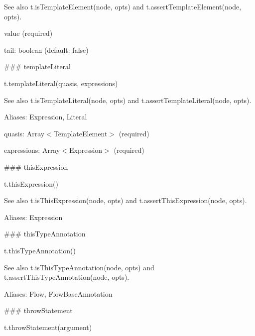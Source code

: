 See also {\ttfamily t.\+is\+Template\+Element(node, opts)} and {\ttfamily t.\+assert\+Template\+Element(node, opts)}.


\begin{DoxyItemize}
\item {\ttfamily value} (required)
\item {\ttfamily tail}\+: {\ttfamily boolean} (default\+: {\ttfamily false}) 


\end{DoxyItemize}

\#\#\# template\+Literal 
\begin{DoxyCode}
t.templateLiteral(quasis, expressions)
\end{DoxyCode}


See also {\ttfamily t.\+is\+Template\+Literal(node, opts)} and {\ttfamily t.\+assert\+Template\+Literal(node, opts)}.

Aliases\+: {\ttfamily Expression}, {\ttfamily Literal}


\begin{DoxyItemize}
\item {\ttfamily quasis}\+: {\ttfamily Array$<$Template\+Element$>$} (required)
\item {\ttfamily expressions}\+: {\ttfamily Array$<$Expression$>$} (required) 


\end{DoxyItemize}

\#\#\# this\+Expression 
\begin{DoxyCode}
t.thisExpression()
\end{DoxyCode}


See also {\ttfamily t.\+is\+This\+Expression(node, opts)} and {\ttfamily t.\+assert\+This\+Expression(node, opts)}.

Aliases\+: {\ttfamily Expression}





\#\#\# this\+Type\+Annotation 
\begin{DoxyCode}
t.thisTypeAnnotation()
\end{DoxyCode}


See also {\ttfamily t.\+is\+This\+Type\+Annotation(node, opts)} and {\ttfamily t.\+assert\+This\+Type\+Annotation(node, opts)}.

Aliases\+: {\ttfamily Flow}, {\ttfamily Flow\+Base\+Annotation}





\#\#\# throw\+Statement 
\begin{DoxyCode}
t.throwStatement(argument)
\end{DoxyCode}


